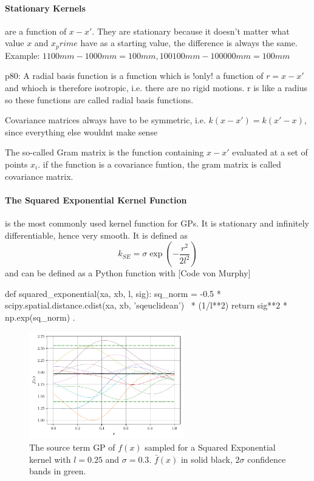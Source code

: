\documentclass[%
  a4paper,oneside,%
  11pt,%
  smallchapters,
  green,%
  rgb, <cmyk>
  ,]{tubsbook}
\begin{document}
\paragraph{Stationary Kernels} are a function of $x-x'$. They are stationary because it doesn't matter what value $x$ and $x_prime$ have as a starting value, the difference is always the same. Example: $1100mm -1000mm = 100 mm, 100100mm-100000mm = 100mm$


p80: A radial basis function is a function which is !only! a function of $r=x-x'$ and whioch is therefore isotropic, i.e. there are no rigid motions. r is like a radius so these functions are called radial basis functions.

Covariance matrices always have to be symmetric, i.e. $k(x-x') = k(x'-x)$, since everything else wouldnt make sense

The so-called Gram matrix is the function containing $x-x'$ evaluated at a set of points $x_i$. if the function is a covariance funtion, the gram matrix is called covariance matrix.
\paragraph{The Squared Exponential Kernel Function} is the most commonly used kernel function for GPs. It is stationary and infinitely differentiable, hence very smooth. 
It is defined as
\begin{equation}
k_{SE} = \sigma \exp(-\frac{r^2}{2l^2})
\end{equation}
%
and can be defined as a Python function with
[Code von Murphy] 
\begin{python}
def squared_exponential(xa, xb, l, sig):
    sq_norm = -0.5 * scipy.spatial.distance.cdist(xa, xb, 'sqeuclidean') \
    	* (1/l**2)
    return sig**2 * np.exp(sq_norm) .
\end{python}
\label{lst:sqEx}


\begin{figure}[h]
\begin{center}

\includegraphics[width=0.6\textwidth]{pics/sqexp_f_sampled}
\caption{The source term GP of $f(x)$ sampled for a Squared Exponential kernel with $l = 0.25$ and $\sigma = 0.3$. $\bar{f}(x)$ in solid black, $2\sigma$ confidence bands in green.}
\label{fig:Matern1_2}

\end{center}
\end{figure}
\end{document}
